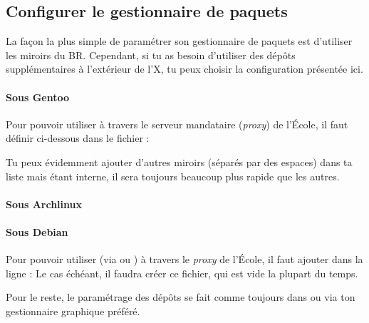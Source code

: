 \subsection{Configurer le gestionnaire de paquets}

La fa\c con la plus simple de param\'etrer son gestionnaire de paquets est d'utiliser les miroirs du BR. Cependant, si tu as besoin d'utiliser des d\'ep\^ots suppl\'ementaires \`a l'ext\'erieur de l'X, tu peux choisir
la configuration pr\'esent\'ee ici.

\paragraph{Sous Gentoo}
\label{gentoo_mirror} Pour pouvoir utiliser  \`a  travers le serveur mandataire (\emph{proxy}) de l'\'Ecole, il faut d\'efinir %
ci-dessous dans le fichier  :

Tu peux \'evidemment ajouter d'autres miroirs (s\'epar\'es par des espaces) dans ta liste mais  \'etant interne, il sera toujours beaucoup plus rapide que les autres.

\paragraph{Sous Archlinux}

\paragraph{Sous Debian}
\label{debian_mirror} Pour pouvoir utiliser  (via  ou ) \`a travers le \emph{proxy} de l'\'Ecole, il faut ajouter dans  la ligne :
Le cas \'ech\'eant, il faudra cr\'eer ce fichier, qui est vide la plupart du temps.

Pour le reste, le param\'etrage des d\'ep\^ots se fait comme toujours dans  ou via ton gestionnaire graphique pr\'ef\'er\'e.
